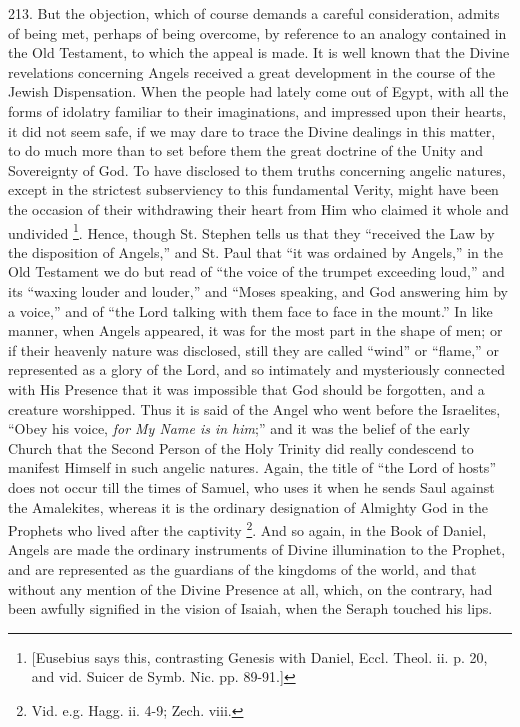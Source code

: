 213.
But the objection, which of course demands a careful consideration,
admits of being met, perhaps of being overcome, by reference to an
analogy contained in the Old Testament, to which the appeal is made.
It is well known that the Divine revelations concerning Angels
received a great development in the course of the Jewish Dispensation.
When the people had lately come out of Egypt, with all the forms of
idolatry familiar to their imaginations, and impressed upon their
hearts, it did not seem safe, if we may dare to trace the Divine
dealings in this matter, to do much more than to set before them the
great doctrine of the Unity and Sovereignty of God. To have disclosed
to them truths concerning angelic natures, except in the strictest
subserviency to this fundamental Verity, might have been the occasion
of their withdrawing their heart from Him who claimed it whole and
undivided \footnote{[Eusebius says this, contrasting Genesis with Daniel, Eccl. Theol. ii.
p. 20, and vid. Suicer de Symb. Nic. pp. 89-91.]}. Hence, though
St. Stephen tells us that they ``received the Law by the disposition of
Angels,'' and St. Paul that ``it was ordained by Angels,'' in the Old
Testament we do but read of ``the voice of the trumpet exceeding loud,''
and its ``waxing louder and louder,'' and ``Moses speaking, and God
answering him by a voice,'' and of ``the Lord talking with them face to
face in the mount.'' In like manner, when Angels appeared, it was for
the most part in the shape of men; or if their heavenly nature
was disclosed, still they are called ``wind'' or ``flame,'' or
represented as a glory of the Lord, and so intimately and mysteriously
connected with His Presence that it was impossible that God should be
forgotten, and a creature worshipped. Thus it is said of the Angel who
went before the Israelites, ``Obey his voice, \emph{for My Name is in him};''
and it was the belief of the early Church that the Second Person of
the Holy Trinity did really condescend to manifest Himself in such
angelic natures. Again, the title of ``the Lord of hosts'' does not
occur till the times of Samuel, who uses it when he sends Saul against
the Amalekites, whereas it is the ordinary designation of Almighty God
in the Prophets who lived after the captivity \footnote{Vid. e.g. Hagg. ii. 4-9; Zech. viii.}. And so again, in the Book of Daniel, Angels are made the
ordinary instruments of Divine illumination to the Prophet, and are
represented as the guardians of the kingdoms of the world, and that
without any mention of the Divine Presence at all, which, on the
contrary, had been awfully signified in the vision of Isaiah, when the
Seraph touched his lips.

